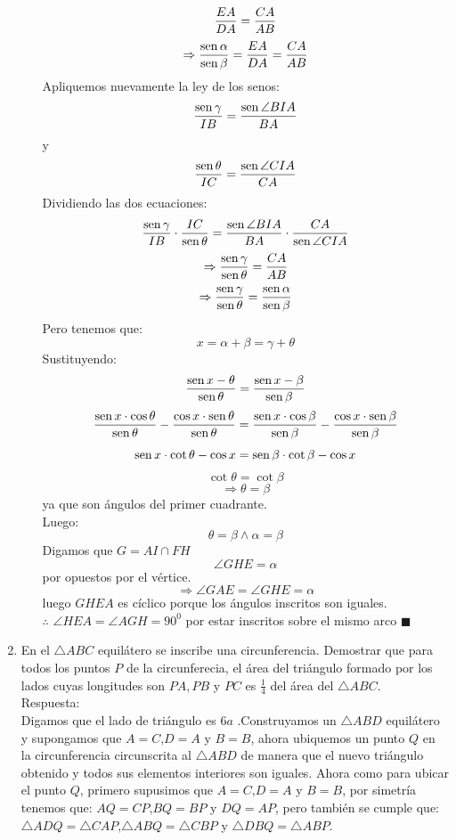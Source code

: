 \documentclass{book}
\newcommand{\sen}{\mathop{\rm sen}\nolimits} %
\begin{document}
\begin{enumerate}
\begin{enumerate}
            $${EA\over DA}={CA\over AB}$$
            $$\Rightarrow{\sen \alpha\over\sen \beta}={EA\over DA}={CA\over AB}$$
            Apliquemos nuevamente la ley de los senos:
            $${\sen \gamma\over IB}={\sen {\angle BIA}\over BA}$$
            y
            $${\sen \theta\over IC}={\sen {\angle CIA}\over CA}$$
            Dividiendo las dos ecuaciones:
            $${\sen \gamma\over IB}\cdot{IC\over\sen \theta}={\sen {\angle BIA}\over BA}\cdot{CA\over\sen {\angle CIA}}$$
            $$\Rightarrow{\sen \gamma\over\sen \theta}={CA\over AB}$$
            $$\Rightarrow{\sen \gamma\over\sen \theta}={\sen \alpha\over\sen \beta}$$
            Pero tenemos que:
            $$x=\alpha+\beta=\gamma+\theta$$
            Sustituyendo:
            $${\sen {x-\theta}\over\sen \theta}={\sen {x-\beta}\over\sen \beta}$$
            $$\frac{\sen x\cdot\cos \theta}{\sen \theta}-\frac{\cos x\cdot\sen \theta}{\sen \theta}=\frac{\sen x\cdot\cos \beta}{\sen \beta}-\frac{\cos x\cdot\sen \beta}{\sen \beta}$$
            $$\sen x\cdot\cot \theta-\cos x=\sen \beta\cdot\cot \beta-\cos x$$
            $$\cot \theta=\cot \beta$$
            $$\Rightarrow\theta=\beta$$
            ya que son ángulos del primer cuadrante.\\
            Luego:
            $$\theta=\beta\wedge\alpha=\beta$$
            Digamos que $G=AI\cap FH$
            $$\angle GHE=\alpha$$
            por opuestos por el vértice.
            $$\Rightarrow\angle GAE=\angle GHE=\alpha$$
            luego $GHEA$ es cíclico porque los ángulos inscritos son iguales.\\
            $\therefore$ $\angle HEA=\angle AGH=90^0$ por estar inscritos sobre el mismo arco $\blacksquare$\\
        \end{enumerate}
        \item En el $\triangle ABC$ equilátero se inscribe una circunferencia. Demostrar que para todos los puntos $P$ de la circunferecia, el área del triángulo formado por los lados cuyas longitudes son $PA, PB$ y $PC$ es $\displaystyle{\frac{1}{4}}$ del área del $\triangle ABC$. \\
        Respuesta:\\
        Digamos que el lado de triángulo es $6a$ .Construyamos un $\triangle ABD$ equilátero y supongamos que $A=C$,$D=A$ y $B=B$, ahora ubiquemos un punto $Q$ en la circunferencia circunscrita al $\triangle ABD$ de manera que el nuevo triángulo obtenido y todos sus elementos interiores son iguales.
        Ahora como para ubicar el punto $Q$, primero supusimos que $A=C$,$D=A$ y $B=B$, por simetría tenemos que: $AQ=CP$,$BQ=BP$ y $DQ=AP$, pero también se cumple que: $\triangle ADQ=\triangle CAP$,$\triangle ABQ=\triangle CBP$ y $\triangle DBQ=\triangle ABP$.

\end{enumerate}
\end{document}
